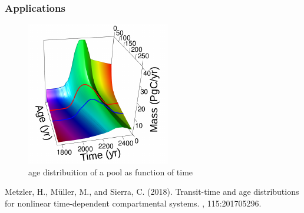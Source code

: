 \begin{frame}
	\frametitle{Applications}
	\begin{figure}
	\includegraphics[height=0.5\textheight]{atmosphere_nonlinear.pdf}
		\caption{age distribuition of a pool as function of time}
	\end{figure}
	\begin{thebibliography}{}
	Metzler, H., M{\"u}ller, M., and Sierra, C. (2018).
	\newblock Transit-time and age distributions for nonlinear time-dependent
	  compartmental systems.
	, 115:201705296.
	\end{thebibliography}
\end{frame}


